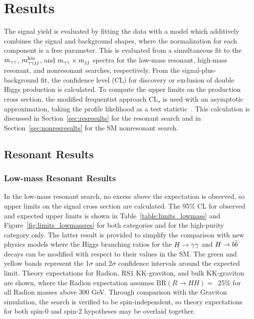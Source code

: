\chapter{Results\label{ch:results}}

The signal yield is evaluated by fitting the data with a model which additively combines the signal
and background shapes, where the normalization for each component is a free parameter.
This is evaluated from a simultaneous fit to the $m_{\gamma\gamma}$, $m_{\gamma\gamma jj}^{\rm kin}$, and $m_{\gamma\gamma} \times m_{jj}$ spectra
for the low-mass resonant, high-mass resonant, and nonresonant searches, respectively.
From the signal-plus-background fit, the confidence level (CL)
for discovery or exclusion of double Higgs production is calculated.
To compute the upper limits on the production cross section, the modified frequentist approach
$\text{CL}_s$ is used with an asymptotic approximation, taking the profile likelihood as a test
statistic~\cite{CLS1,CLS2}. This calculation is discussed in Section~\ref{sec:resresults} for the
resonant search and in Section~\ref{sec:nonresresults} for the SM nonresonant search.

\section{Resonant Results\label{sec:resresults}}

\subsection{Low-mass Resonant Results}

In the low-mass resonant search,
no excess above the expectation is observed, so upper limits on the signal cross section are calculated.
The 95\% CL for observed and expected upper limits is shown in
Table~\ref{table:limits_lowmass} and Figure~\ref{fig:limits_lowmassres}
for both categories and for the high-purity category only.
The latter result is provided to simplify the comparison with new physics models where
the Higgs branching ratios for the $H\to\gamma\gamma$ and $H\to b\bar{b}$ decays can be modified with respect to their
values in the SM.
The green and yellow bands represent the 1$\sigma$ and 2$\sigma$
confidence intervals around the expected limit. Theory expectations for Radion, RS1 KK-graviton, and 
bulk KK-graviton are shown, where the Radion expectation assumes $\text{BR}(R\rightarrow HH) =$~25\%
for all Radion masses above 300 GeV. Through comparison with the Graviton simulation,
the search is verified to be spin-independent, so theory expectations for both spin-0 and spin-2
hypotheses may be overlaid together.

